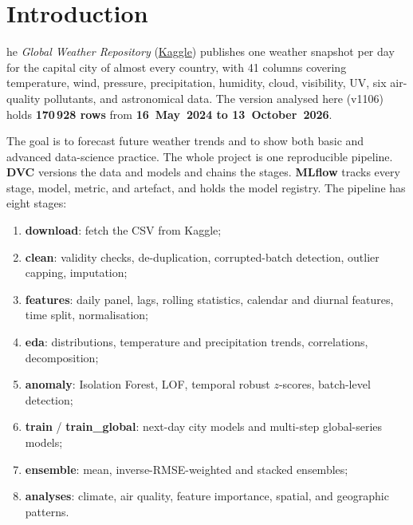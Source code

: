 \section{Introduction}
he \emph{Global Weather Repository} (\href{https://www.kaggle.com/datasets/nelgiriyewithana/global-weather-repository}{Kaggle}) publishes one
weather snapshot per day for the capital city of almost every country, with 41 columns covering temperature,
wind, pressure, precipitation, humidity, cloud, visibility, UV, six air-quality pollutants, and astronomical data.
The version analysed here (v1106) holds \textbf{170\,928 rows} from \textbf{16~May~2024 to 13~October~2026}.

The goal is to forecast future weather trends and to show both basic and advanced data-science practice.
The whole project is one reproducible pipeline. \textbf{DVC} versions the data and models and chains the stages.
\textbf{MLflow} tracks every stage, model, metric, and artefact, and holds the model registry.
The pipeline has eight stages:
\begin{enumerate}
  \item \textbf{download}: fetch the CSV from Kaggle;
  \item \textbf{clean}: validity checks, de-duplication, corrupted-batch detection, outlier capping, imputation;
  \item \textbf{features}: daily panel, lags, rolling statistics, calendar and diurnal features, time split, normalisation;
  \item \textbf{eda}: distributions, temperature and precipitation trends, correlations, decomposition;
  \item \textbf{anomaly}: Isolation Forest, LOF, temporal robust $z$-scores, batch-level detection;
  \item \textbf{train} / \textbf{train\_global}: next-day city models and multi-step global-series models;
  \item \textbf{ensemble}: mean, inverse-RMSE-weighted and stacked ensembles;
  \item \textbf{analyses}: climate, air quality, feature importance, spatial, and geographic patterns.
\end{enumerate}
